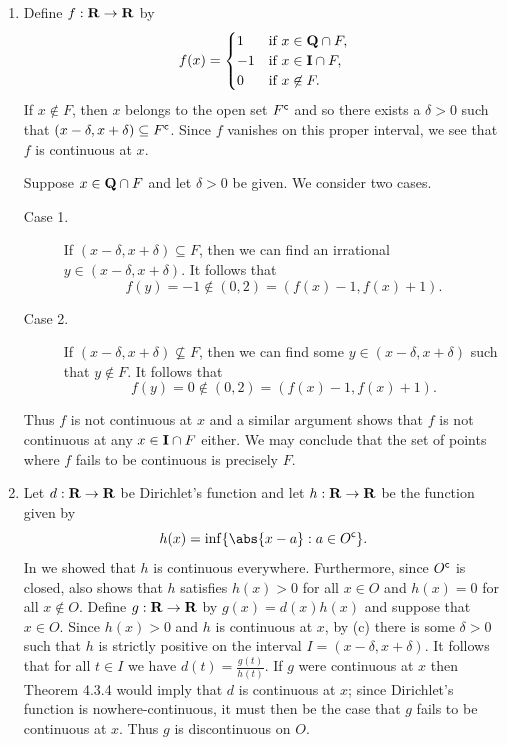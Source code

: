 \documentclass{lew98_solutions}
\begin{document}
\begin{solution}
    \begin{enumerate}
        \item Define \( f : \mathbf{R} \to \mathbf{R} \) by
        \[
            f(x) = \begin{cases}
                1 & \text{if } x \in \mathbf{Q} \cap F, \\
                -1 & \text{if } x \in \mathbf{I} \cap F, \\
                0 & \text{if } x \not\in F.
            \end{cases}
        \]
        If \( x \not\in F \), then \( x \) belongs to the open set \( F^{\mathsf{c}} \) and so there exists a \( \delta > 0 \) such that \( (x - \delta, x + \delta) \subseteq F^{\mathsf{c}} \). Since \( f \) vanishes on this proper interval, we see that \( f \) is continuous at \( x \).

        Suppose \( x \in \mathbf{Q} \cap F \) and let \( \delta > 0 \) be given. We consider two cases.
        \begin{description}
            \item[Case 1.] If \( (x - \delta, x + \delta) \subseteq F \), then we can find an irrational \( y \in (x - \delta, x + \delta) \). It follows that
            \[
                f(y) = -1 \not\in (0, 2) = (f(x) - 1, f(x) + 1).
            \]

            \item[Case 2.] If \( (x - \delta, x + \delta) \not\subseteq F \), then we can find some \( y \in (x - \delta, x + \delta) \) such that \( y \not\in F \). It follows that
            \[
                f(y) = 0 \not\in (0, 2) = (f(x) - 1, f(x) + 1).
            \]
        \end{description}
        Thus \( f \) is not continuous at \( x \) and a similar argument shows that \( f \) is not continuous at any \( x \in \mathbf{I} \cap F \) either. We may conclude that the set of points where \( f \) fails to be continuous is precisely \( F \).

        \item Let \( d : \mathbf{R} \to \mathbf{R} \) be Dirichlet's function and let \( h : \mathbf{R} \to \mathbf{R} \) be the function given by
        \[
            h(x) = \inf \{ \abs{x - a} : a \in \setcomp{O} \}.
        \]
        In  we showed that \( h \) is continuous everywhere. Furthermore, since \( O^{\mathsf{c}} \) is closed,  also shows that \( h \) satisfies \( h(x) > 0 \) for all \( x \in O \) and \( h(x) = 0 \) for all \( x \not\in O \). Define \( g : \mathbf{R} \to \mathbf{R} \) by \( g(x) = d(x) h(x) \) and suppose that \( x \in O \). Since \( h(x) > 0 \) and \( h \) is continuous at \( x \), by  (c) there is some \( \delta > 0 \) such that \( h \) is strictly positive on the interval \( I = (x - \delta, x + \delta) \). It follows that for all \( t \in I \) we have \( d(t) = \tfrac{g(t)}{h(t)} \). If \( g \) were continuous at \( x \) then Theorem 4.3.4 would imply that \( d \) is continuous at \( x \); since Dirichlet's function is nowhere-continuous, it must then be the case that \( g \) fails to be continuous at \( x \). Thus \( g \) is discontinuous on \( O \).


\end{enumerate}
\end{solution}
\end{document}

